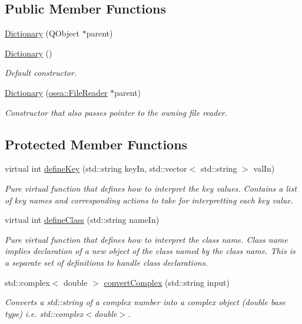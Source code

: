 \subsection*{Public Member Functions}
\begin{DoxyCompactItemize}
\item 
\hyperlink{classosea_1_1_dictionary_a6ff9dd5005c8796e0cc13a8bc4cb2288}{Dictionary} (Q\-Object $\ast$parent)
\item 
\hyperlink{classosea_1_1_dictionary_aee8d612bc9d323c38faba045ba384b8b}{Dictionary} ()
\begin{DoxyCompactList}\small\item\em Default constructor. \end{DoxyCompactList}\item 
\hyperlink{classosea_1_1_dictionary_a46d15e6c36d3297217500d5c220ac982}{Dictionary} (\hyperlink{classosea_1_1_file_reader}{osea\-::\-File\-Reader} $\ast$parent)
\begin{DoxyCompactList}\small\item\em Constructor that also passes pointer to the owning file reader. \end{DoxyCompactList}\end{DoxyCompactItemize}
\subsection*{Protected Member Functions}
\begin{DoxyCompactItemize}
\item 
virtual int \hyperlink{classosea_1_1_dictionary_ae96470181c8b1762204493fa45e96d7c}{define\-Key} (std\-::string key\-In, std\-::vector$<$ std\-::string $>$ val\-In)
\begin{DoxyCompactList}\small\item\em Pure virtual function that defines how to interpret the key values. Contains a list of key names and corresponding actions to take for interpretting each key value. \end{DoxyCompactList}\item 
virtual int \hyperlink{classosea_1_1_dictionary_a42843f64aa966b8c686d9e3750cbdb4b}{define\-Class} (std\-::string name\-In)
\begin{DoxyCompactList}\small\item\em Pure virtual function that defines how to interpret the class name. Class name implies declaration of a new object of the class named by the class name. This is a separate set of definitions to handle class declarations. \end{DoxyCompactList}\item 
std\-::complex$<$ double $>$ \hyperlink{classosea_1_1_dictionary_ac714952a7fcf99ab69de015c606322ad}{convert\-Complex} (std\-::string input)
\begin{DoxyCompactList}\small\item\em Converts a std\-::string of a complex number into a complex object (double base type) i.\-e. std\-::complex$<$double$>$. \end{DoxyCompactList}\end{DoxyCompactItemize}
